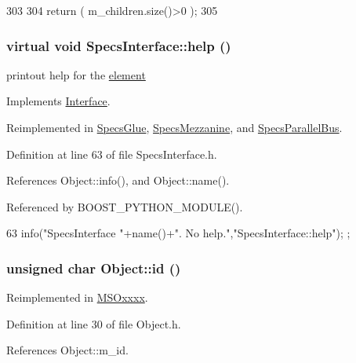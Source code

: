 \begin{DoxyCode}
303                               {
304   return ( m_children.size()>0 );
305 }
\end{DoxyCode}
\hypertarget{classSpecsInterface_a24bf2b5e2da6c675ba5de3b226481a73}{
\subsubsection[{help}]{\setlength{\rightskip}{0pt plus 5cm}virtual void SpecsInterface::help ()}}
\label{classSpecsInterface_a24bf2b5e2da6c675ba5de3b226481a73}
printout help for the \hyperlink{namespaceelement}{element} 

Implements \hyperlink{classInterface_aedd3cf1d964c837e7848ccf81dc9c760}{Interface}.

Reimplemented in \hyperlink{classSpecsGlue_a04fd0c122ac6980833fd87af92377791}{SpecsGlue}, \hyperlink{classSpecsMezzanine_a9cbb99c91d987194009be1cb81d2ba7c}{SpecsMezzanine}, and \hyperlink{classSpecsParallelBus_a67b05d066de051d33a6afff267f9178e}{SpecsParallelBus}.

Definition at line 63 of file SpecsInterface.h.

References Object::info(), and Object::name().

Referenced by BOOST\_\-PYTHON\_\-MODULE().


\begin{DoxyCode}
63 { info("SpecsInterface "+name()+". No help.","SpecsInterface::help"); };
\end{DoxyCode}
\hypertarget{classObject_af99145335cc61ff6e2798ea17db009d2}{
\subsubsection[{id}]{\setlength{\rightskip}{0pt plus 5cm}unsigned char Object::id ()}}
\label{classObject_af99145335cc61ff6e2798ea17db009d2}


Reimplemented in \hyperlink{classMSOxxxx_a0f14b23d31d8e7647184e99a89600cc3}{MSOxxxx}.

Definition at line 30 of file Object.h.

References Object::m\_\-id.

